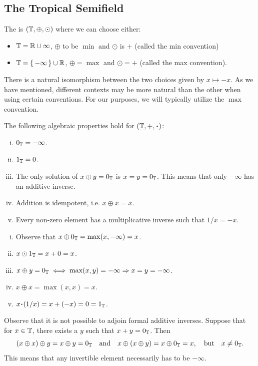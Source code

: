 \documentclass[12pt]{memoir}
\theoremstyle{definition}
\begin{document}
\subsection{The Tropical Semifield}

\begin{Def}
    The  is $(\mathbb{T},\oplus,\odot)$ where we can choose either:
    \begin{itemize}
        \item $\mathbb{T}=\mathbb{R}\cup\infty$, $\oplus$ to be $\min$ and $\odot$ is $+$ (called the min convention)
        \item $\mathbb{T}=\{\,-\infty\,\}\cup\mathbb{R}$, $\oplus=\max$ and $\odot=+$ (called the max convention).
    \end{itemize}
\end{Def}

There is a natural isomorphism between the two choices given by $x\mapsto -x$. As we have mentioned, different contexts may be more natural than the other when using certain conventions. For our purposes, we will typically utilize the $\max$ convention. 

\begin{Prop}
The following algebraic properties hold for $(\bT,+,\.)$:
\begin{enumerate}[i)]
    \itemsep=-0.4em
    \item $0_{\mathbb{T}}=-\infty$.
    \item $1_{\mathbb{T}}=0$.
    \item The only solution of $x\oplus y=0_{\mathbb{T}}$ is $x=y=0_{\mathbb{T}}$. This means that only $-\infty$ has an additive inverse.
    \item Addition is idempotent, i.e. $x\oplus x=x$.
    \item Every non-zero element has a multiplicative inverse such that $1/x=-x$.
\end{enumerate}
\end{Prop}

\begin{ptcbp}
    \begin{enumerate}[i)]
        \itemsep=-0.4em
    \item Observe that $x\oplus0_{\mathbb{T}}=\max(x,-\infty)=x$.
    \item $x\odot 1_{\mathbb{T}}=x+0=x$.
    \item $x\oplus y=0_{\mathbb{T}}\iff \max(x,y)=-\infty\Rightarrow x=y=-\infty$.
    \item $x\oplus x=\max(x,x)=x$.
    \item $x\.(1/x)=x+(-x)=0=1_\bT$.
\end{enumerate}
\end{ptcbp}
Observe that it is not possible to adjoin formal additive inverses. Suppose that for $x\in\mathbb{T}$, there exists a $y$ such that $x+y=0_{\mathbb{T}}$. Then 
$$(x\oplus x)\oplus y=x\oplus y=0_{\mathbb{T}}\quad\text{and}\quad x\oplus (x\oplus y)=x\oplus 0_{\mathbb{T}}=x,\quad\text{but}\quad x\neq 0_{\mathbb{T}}.$$
This means that any invertible element necessarily has to be $-\infty$.
\end{document}
